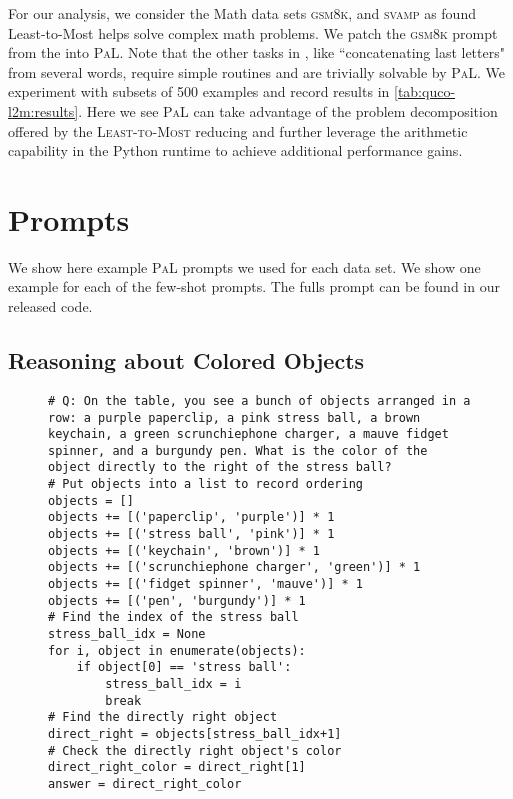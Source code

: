 \documentclass[dvipsnames]{article} \usepackage[accepted]{icml2022}
\newcommand{\ours}{\textsc{PaL}\xspace}
\newcommand{\tomost}{\textsc{Least-to-Most}\xspace}
\newcommand{\gsm}{\textsc{gsm8k}\xspace}
\newcommand{\svamp}{\textsc{svamp}\xspace}
\begin{document}
For our analysis, we consider the Math data sets \gsm, and \svamp as \citet{zhou2022least} found Least-to-Most helps solve complex math problems. We patch the \gsm prompt from the \citet{zhou2022least} into \ours. Note that the other tasks in \citet{zhou2022least}, like ``concatenating last letters" from several words, require simple routines and are trivially solvable by \ours. We experiment with subsets of 500 examples and record results in \autoref{tab:quco-l2m:results}. Here we see \ours can take advantage of the problem decomposition offered by the \tomost reducing and further leverage the arithmetic capability in the Python runtime to achieve additional performance gains.

\clearpage

\section{Prompts}
\label{sec:appendixprompts}
We show here example \ours prompts we used for each data set. We show one example for each of the few-shot prompts. The fulls prompt can be found in our released code.

\subsection{Reasoning about Colored Objects}
\begin{figure*}[!h]
\centering
\begin{subfigure}[t]{.95\textwidth}

 \begin{verbatim}
# Q: On the table, you see a bunch of objects arranged in a row: a purple paperclip, a pink stress ball, a brown keychain, a green scrunchiephone charger, a mauve fidget spinner, and a burgundy pen. What is the color of the object directly to the right of the stress ball?
# Put objects into a list to record ordering
objects = []
objects += [('paperclip', 'purple')] * 1
objects += [('stress ball', 'pink')] * 1
objects += [('keychain', 'brown')] * 1
objects += [('scrunchiephone charger', 'green')] * 1
objects += [('fidget spinner', 'mauve')] * 1
objects += [('pen', 'burgundy')] * 1
# Find the index of the stress ball
stress_ball_idx = None
for i, object in enumerate(objects):
    if object[0] == 'stress ball':
        stress_ball_idx = i
        break
# Find the directly right object
direct_right = objects[stress_ball_idx+1]
# Check the directly right object's color
direct_right_color = direct_right[1]
answer = direct_right_color
\end{verbatim}
\end{subfigure}
\end{figure*}
\end{document}
